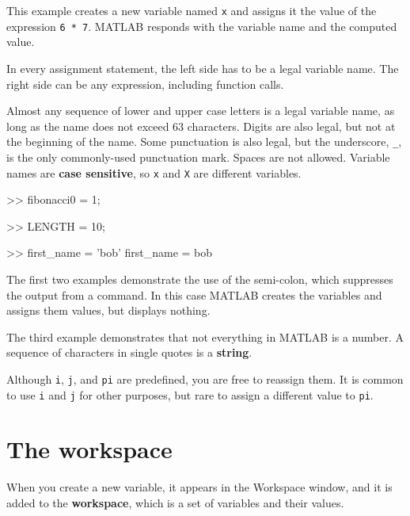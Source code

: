 \documentclass[
]{book}
\numberwithin{Answer}{chapter}
\numberwithin{Exercise}{chapter}
\begin{document}
This example creates a new variable named {\tt x} and assigns it the
value of the expression {\tt 6 * 7}.  MATLAB responds with the
variable name and the computed value.


In every assignment statement, the left side has to be a legal variable name.  The right side can be any expression, including function calls.


Almost any sequence of lower and upper case letters is a legal
variable name, as long as the name does not exceed 63 characters.  
Digits are also legal, but not at the beginning of the name.
Some punctuation is also legal, but the underscore,
\verb"_", is the only commonly-used punctuation mark.  
Spaces are not allowed.  Variable names are
{\bf case sensitive}, so {\tt x} and {\tt X} are different variables.

\begin{code}
>> fibonacci0 = 1;

>> LENGTH = 10;

>> first_name = 'bob'
first_name = bob
\end{code}

The first two examples demonstrate the use of the semi-colon, which
suppresses the output from a command.  In this case MATLAB creates the
variables and assigns them values, but displays nothing.


The third example demonstrates that not everything
in MATLAB is a number.
A sequence of characters in single quotes is
a {\bf string}.


Although {\tt i}, {\tt j}, and {\tt pi} are predefined, you are free
to reassign them.  It is common to use {\tt i} and {\tt j} for other
purposes, but rare to assign a different value to
{\tt pi}.



\section{The workspace}

When you create a new variable, it appears in the {\sf Workspace} window, and it is added to the {\bf workspace}, which is a
set of variables and their values.
\end{document}
